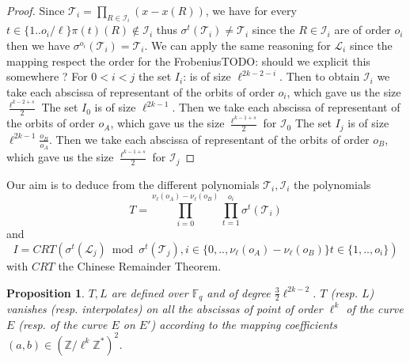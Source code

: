 \documentclass{lms}
\newcommand{\todo}[1]{{\color{red}TODO: #1}}
\newtheorem{prop}[thm]{Proposition}
\begin{document}
\begin{proof}
Since $\mathcal{T}_i=\prod_{R \in \mathcal{I}_i}(x-x(R))$, we have for every $t \in \{1 .. o_i/\ell \}  \pi(t)(R) \not \in  \mathcal{I}_i $ thus $\sigma^t(\mathcal{T}_i) \neq \mathcal{T}_i$ since the $R \in \mathcal{I}_i$ are of order $o_i$ then we have $\sigma^{o_i}(\mathcal{T}_i)=\mathcal{T}_i$. We can apply the same reasoning for $\mathcal{L}_i$ since the mapping respect the order for the Frobenius\todo{should we explicit this somewhere ?} 
    \newline
For $0 < i < j$ the set $I_i$: is of size $\ell^{2k-2-i}$. Then to obtain $\mathcal{I}_i$ we take each abscissa of representant of the orbits of order $o_i$, which gave us the size $\frac{\ell^{k-2+s}}{2}$
\newline
The set $I_0$ is of size $\ell^{2k-1}$. Then we take each abscissa of representant of the orbits of order $o_A$, which gave us the size $\frac{\ell^{k-1+s}}{2}$ for $\mathcal{I}_0$
\newline
The set $I_j$ is of size $\ell^{2k-1} \frac{o_B}{o_A}$. Then we take each abscissa of representant of the orbits of order $o_B$, which gave us the size $\frac{\ell^{k-1+s}}{2}$   for $\mathcal{I}_j$
\end{proof}


Our aim is to deduce from the different polynomials $\mathcal{T}_i,
\mathcal{I}_i$ the polynomials
$$T=\prod_{i=0}^{\nu_{\ell}(o_A)-\nu_{\ell}(o_B)}\prod_{t=1}^{o_i}\sigma^{t}(\mathcal{T}_i)$$ 
and
$$I= CRT(\sigma^{t}(\mathcal{L}_j) \bmod \sigma^{t}(\mathcal{T}_j), i\in \{ 0,.., \nu_{\ell}(o_A)-\nu_{\ell}(o_B) \}  t \in \{ 1,..,o_i \} )$$
with $CRT$ the Chinese Remainder Theorem.

\begin{prop}
$T ,L $ are defined over $\mathbb{F}_q$ and of degree $\frac{3}{2}\ell^{2k-2}$. $T$ (resp. $L$) vanishes (resp. interpolates) on all the abscissas of point of order $\ell^k$ of the curve $E$ (resp. of the curve $E$ on $E'$) according to the mapping coefficients $(a,b) \in \left( \mathbb{Z}/ \ell^k \mathbb{Z} ^* \right)^2$.  
\end{prop}
\end{document}
